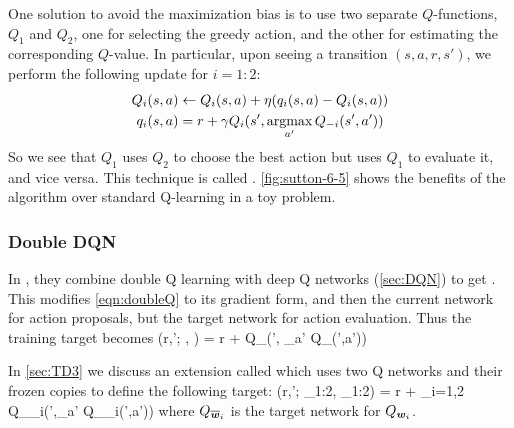 One solution to avoid the maximization bias is to
use two separate $Q$-functions, $Q_1$ and $Q_2$,
one for selecting the greedy action,
and the other for estimating the corresponding $Q$-value.
In particular, upon seeing a transition $(s,a,r,s')$,
we perform the following update for $i=1:2$:
\begin{align}
  Q_i(s,a) &\assign Q_i(s,a) + \lr(\targetV_i(s,a) - Q_i(s,a)) \\
  \targetV_i(s,a) &= r + \gamma Q_{i}(s', \argmax_{a'} Q_{-i}(s', a'))
  \label{eqn:doubleQ}
\end{align}
So we see that $Q_1$ uses $Q_2$ to choose the best action
but uses $Q_1$ to evaluate it,
and vice versa.
This technique is called
 \citep{vanHasselt2010}.
\cref{fig:sutton-6-5} shows the benefits of
the algorithm over standard Q-learning
in a toy problem.

\subsubsection{Double DQN}
\label{sec:doubleDQN}


In \citep{vanHasselt2016}, they combine double Q learning
with deep Q networks (\cref{sec:DQN}) to get .
This modifies \cref{eqn:doubleQ}
to its gradient form, and then the current network for action
proposals, but the target network for action evaluation.
Thus  the  training target becomes
\be
\TargetV(r,\vs'; \vw, \overline{\vw}) = r + \gamma
Q_{\overline{\vw}}(\vs', \argmax_{a'} Q_{\vw}(\vs',a'))
\ee

In \cref{sec:TD3} we discuss an extension called
 which uses two Q networks
and their frozen copies
to define
the following target:
\be
\TargetV(r,\vs'; \vw_{1:2}, \overline{\vw}_{1:2}) = r + \gamma  \min_{i=1,2}
Q_{\overline{\vw}_i}(\vs',\argmax_{a'} Q_{\vw_i}(\vs',a'))
\ee
where $Q_{\overline{{\bm{w}}}_i}$ is the target network for $Q_{{\bm{w}}_i}$.

